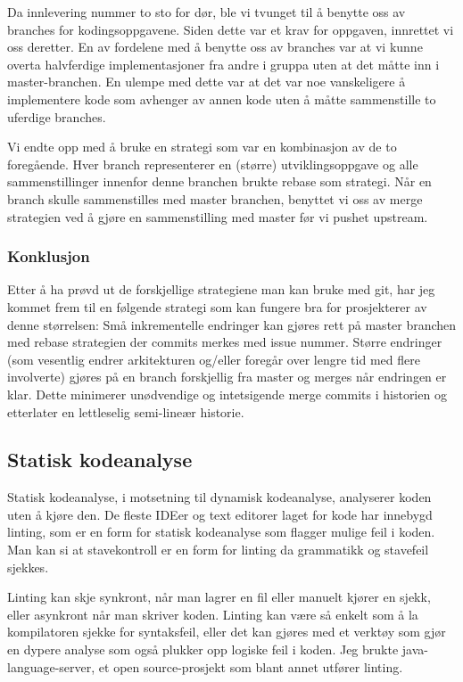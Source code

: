 \documentclass[12pt,a4paper]{article}
\begin{document}
Da innlevering nummer to sto for dør, ble vi tvunget til å benytte oss
av branches for kodingsoppgavene. Siden dette var et krav for oppgaven,
innrettet vi oss deretter. En av fordelene med å benytte oss av branches
var at vi kunne overta halvferdige implementasjoner fra andre i gruppa
uten at det måtte inn i master-branchen. En ulempe med dette var at det
var noe vanskeligere å implementere kode som avhenger av annen kode uten
å måtte sammenstille to uferdige branches.

Vi endte opp med å bruke en strategi som var en kombinasjon av de to
foregående. Hver branch representerer en (større) utviklingsoppgave og
alle sammenstillinger innenfor denne branchen brukte rebase som
strategi. Når en branch skulle sammenstilles med master branchen,
benyttet vi oss av merge strategien ved å gjøre en sammenstilling med
master før vi pushet upstream.

\subsubsection*{Konklusjon}

Etter å ha prøvd ut de forskjellige strategiene man kan bruke med git,
har jeg kommet frem til en følgende strategi som kan fungere bra for
prosjekterer av denne størrelsen: Små inkrementelle endringer kan gjøres
rett på master branchen med rebase strategien der commits merkes med
issue nummer. Større endringer (som vesentlig endrer arkitekturen
og/eller foregår over lengre tid med flere involverte) gjøres på en
branch forskjellig fra master og merges når endringen er klar. Dette
minimerer unødvendige og intetsigende merge commits i historien og
etterlater en lettleselig semi-lineær historie.

\subsection*{Statisk kodeanalyse}

Statisk kodeanalyse, i motsetning til dynamisk kodeanalyse, analyserer
koden uten å kjøre den.
De fleste IDEer og text editorer laget for kode
har innebygd linting, som er en form for statisk kodeanalyse som flagger
mulige feil i koden. Man kan si at stavekontroll er en form for linting
da grammatikk og stavefeil sjekkes.

Linting kan skje synkront, når man lagrer en fil eller manuelt kjører en
sjekk, eller asynkront når man skriver koden. Linting kan være så enkelt
som å la kompilatoren sjekke for syntaksfeil, eller det kan gjøres med
et verktøy som gjør en dypere analyse som også plukker opp logiske feil
i koden. Jeg brukte java-language-server, et open source-prosjekt som
blant annet utfører linting.
\end{document}
